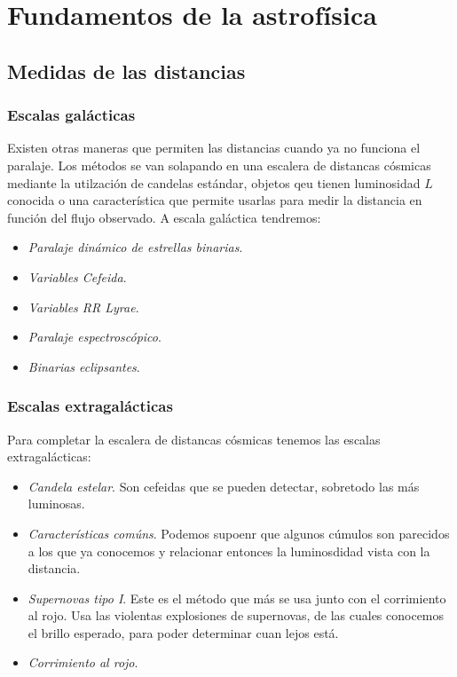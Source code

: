 \chapter{Fundamentos de la astrofísica}

\section{Medidas de las distancias}

\subsection{Escalas galácticas}

Existen otras maneras que permiten las distancias cuando ya no funciona el paralaje. Los métodos se van solapando en una escalera de distancas cósmicas mediante la utilzación de candelas estándar, objetos qeu tienen luminosidad $L$ conocida o una característica que permite usarlas para medir la distancia en función del flujo observado. A escala galáctica tendremos:

\begin{itemize}
    \item \textit{Paralaje dinámico de estrellas binarias}.
    \item \textit{Variables Cefeida}. 
    \item \textit{Variables RR Lyrae}.
    \item \textit{Paralaje espectroscópico}.
    \item \textit{Binarias eclipsantes}.
\end{itemize}

\subsection{Escalas extragalácticas}

Para completar la escalera de distancas cósmicas tenemos las escalas extragalácticas:

\begin{itemize} 
    \item \textit{Candela estelar}. Son cefeidas que se pueden detectar, sobretodo las más luminosas.
    \item \textit{Características comúns}. Podemos supoenr que algunos cúmulos son parecidos a los que ya conocemos y relacionar entonces la luminosdidad vista con la distancia.
    \item \textit{Supernovas tipo I}. Este es el método que más se usa junto con el corrimiento al rojo. Usa las violentas explosiones de supernovas, de las cuales conocemos el brillo esperado, para poder determinar cuan lejos está. 
    \item \textit{Corrimiento al rojo}.
\end{itemize}

